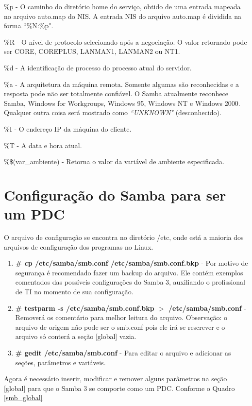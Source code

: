 \%p - O caminho do diretório home do serviço, obtido de uma entrada mapeada no arquivo auto.map do NIS. A entrada NIS do arquivo auto.map é dividida na forma ``\%N:\%p".

\%R - O nível de protocolo selecionado após a negociação. O valor retornado pode ser CORE, COREPLUS, LANMAN1, LANMAN2 ou NT1.

\%d - A identificação de processo do processo atual do servidor.

\%a - A arquitetura da máquina remota. Somente algumas são reconhecidas e a resposta pode não ser totalmente confiável. O Samba atualmente reconhece Samba, Windows for Workgroups, Windows 95, Windows NT e Windows 2000. Qualquer outra coisa será mostrado como \textit{``UNKNOWN"} (desconhecido).

\%I - O endereço IP da máquina do cliente.

\%T - A data e hora atual.

\%\$(var\_ambiente) - Retorna o valor da variável de ambiente especificada.

\section{Configuração do Samba para ser um PDC}

O arquivo de configuração se encontra no diretório /etc, onde está a maioria dos arquivos de configuração dos programas no Linux.

\begin{enumerate}
	\item \textbf{\# cp /etc/samba/smb.conf /etc/samba/smb.conf.bkp} - Por motivo de segurança é recomendado fazer um backup do arquivo. Ele contém exemplos comentados das possíveis configurações do Samba 3, auxiliando o profissional de TI no momento de sua configuração.
	\item \textbf{\# testparm -s /etc/samba/smb.conf.bkp $>$ /etc/samba/smb.conf} - Removerá os comentário para melhor leitura do arquivo. Observação: o arquivo de origem não pode ser o smb.conf pois ele irá se rescrever e o arquivo só conterá a seção [global] vazia.  
	\item \textbf{\# gedit /etc/samba/smb.conf} - Para editar o arquivo e adicionar as seções, parâmetros e variáveis.
\end{enumerate}

Agora é necessário inserir, modificar e remover alguns parâmetros na seção [global] para que o Samba 3 se comporte como um PDC. Conforme o Quadro \ref{smb_global}\\

